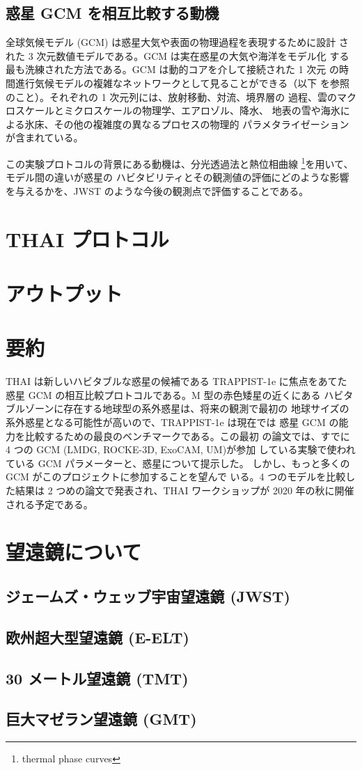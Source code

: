 \documentclass{dennou777}
\begin{document}
\subsection{惑星 GCM を相互比較する動機}

全球気候モデル (GCM) は惑星大気や表面の物理過程を表現するために設計
された 3 次元数値モデルである。GCM は実在惑星の大気や海洋をモデル化
する最も洗練された方法である。GCM は動的コアを介して接続された 1 次元
の時間進行気候モデルの複雑なネットワークとして見ることができる（以下
を参照のこと）。それぞれの 1 次元列には、放射移動、対流、境界層の
過程、雲のマクロスケールとミクロスケールの物理学、エアロゾル、降水、
地表の雪や海氷による氷床、その他の複雑度の異なるプロセスの物理的
パラメタライゼーションが含まれている。

この実験プロトコルの背景にある動機は、分光透過法と熱位相曲線
\footnote{thermal phase curves}を用いて、モデル間の違いが惑星の
ハビタビリティとその観測値の評価にどのような影響を与えるかを、JWST
のような今後の観測点で評価することである。

\section{THAI プロトコル}\label{thai}

\section{アウトプット}\label{outputs}

\section{要約}\label{summary}
THAI は新しいハビタブルな惑星の候補である TRAPPIST-1e に焦点をあてた
惑星 GCM の相互比較プロトコルである。M 型の赤色矮星の近くにある
ハビタブルゾーンに存在する地球型の系外惑星は、将来の観測で最初の
地球サイズの系外惑星となる可能性が高いので、TRAPPIST-1e は現在では
惑星 GCM の能力を比較するための最良のベンチマークである。この最初
の論文では、すでに 4 つの GCM (LMDG, ROCKE-3D, ExoCAM, UM)が参加
している実験で使われている GCM パラメーターと、惑星について提示した。
しかし、もっと多くの GCM がこのプロジェクトに参加することを望んで
いる。4 つのモデルを比較した結果は 2 つめの論文で発表され、THAI
ワークショップが 2020 年の秋に開催される予定である。

\appendix
{}
\section{望遠鏡について\label{telescope}}
\subsection{ジェームズ・ウェッブ宇宙望遠鏡 (JWST)}
\subsection{欧州超大型望遠鏡 (E-ELT)}
\subsection{30 メートル望遠鏡 (TMT)}
\subsection{巨大マゼラン望遠鏡 (GMT)}
\end{document}
